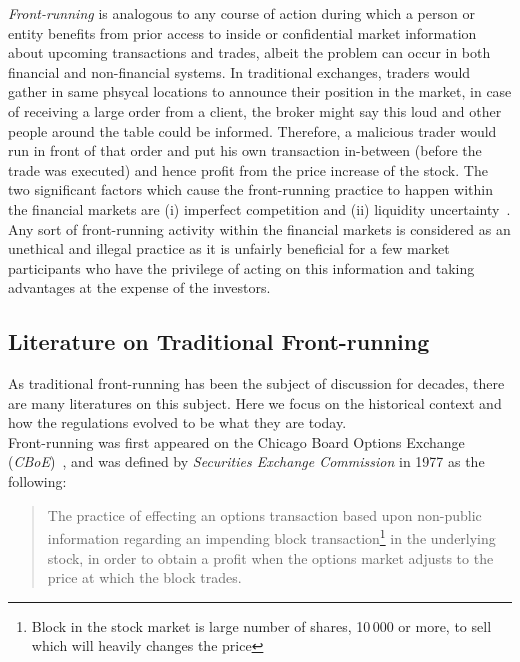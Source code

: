\emph{Front-running} is analogous to any course of action during which a person or entity benefits from prior access to inside or confidential market information about upcoming transactions and trades, albeit the problem can occur in both financial and non-financial systems.  In traditional exchanges, traders would gather in same phsycal locations to announce their position in the market, in case of receiving a large order from a client, the broker might say this loud and other people around the table could be informed. Therefore, a malicious trader would run in front of that order and put his own transaction in-between (before the trade was executed) and hence profit from the price increase of the stock. 
The two significant factors which cause the front-running practice to happen within the financial markets are (i) imperfect competition and (ii) liquidity uncertainty~\cite{liang2005distressed}. Any sort of front-running activity within the financial markets is considered as an unethical and illegal practice as it is unfairly beneficial for a few market participants who have the privilege of acting on this information and taking advantages at the expense of the investors. 

\subsection{Literature on Traditional Front-running}\label{traditionalFrontrunning}
As traditional front-running has been the subject of discussion for decades, there are many literatures on this subject. Here we focus on the historical context and how the regulations evolved to be what they are today.\\
Front-running was first appeared on the Chicago Board Options Exchange (\textit{CBoE})~\cite{markham1988front}, and was defined by \textit{Securities Exchange Commission} in 1977 as the following:
\begin{quote}
The practice of effecting an options transaction based upon non-public information regarding an impending block transaction\footnote{Block in the stock market is large number of shares, 10\,000 or more, to sell which will heavily changes the price} in the underlying stock, in order to obtain a profit when the options market adjusts to the price at which the block trades. ~\cite{sec1978optionsmarket}
\end{quote} 

